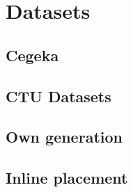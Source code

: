 
\chapter{Datasets} %

\label{datasets} %

\section{Cegeka}

\section{CTU Datasets}

\section{Own generation}

\section{Inline placement}